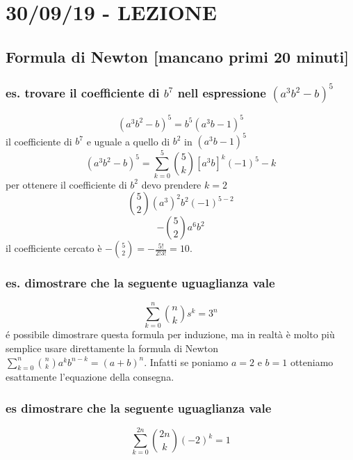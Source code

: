 \section*{30/09/19 - LEZIONE}
\subsection*{Formula di Newton [mancano primi 20 minuti]}

\subsubsection*{es. trovare il coefficiente di $b^7$ nell espressione $(a^3b^2-b)^5$}
\[
    (a^3b^2-b)^5 = b^5(a^3b-1)^5
\] 
il coefficiente di $b^7$ e uguale a quello di $b^2$ in $(a^3b-1)^5$
\[
    (a^3b^2-b)^5 = \sum_{k=0}^5{\binom{5}{k}[a^3b]^k(-1)^5-k}
\] 
per ottenere il coefficiente di $b^2$ devo prendere $k=2$
\[
    \binom{5}{2}(a^3)^2b^2(-1)^{5-2}
\] 
\[
    -\binom{5}{2}a^6b^2
\] 
il coefficiente cercato è $-\binom{5}{2} = -\frac{5!}{2!3!} = 10$.

\subsubsection*{es. dimostrare che la seguente uguaglianza vale}
\[
    \sum_{k=0}^{n}\binom{n}{k}s^k = 3^n
\] 
é possibile dimostrare questa formula per induzione, ma in realtà è molto più semplice usare direttamente la formula di Newton $\sum_{k=0}^n\binom{n}{k}a^kb^{n-k}=(a+b)^n$. Infatti se poniamo $a=2$ e $b=1$ otteniamo esattamente l'equazione della consegna.

\subsubsection*{es dimostrare che la seguente uguaglianza vale}
\[
    \sum_{k=0}^{2n}\binom{2n}{k}(-2)^k=1
\] 

